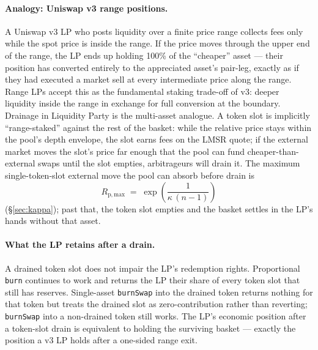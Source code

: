 \documentclass[11pt]{article}
\begin{document}
\paragraph{Analogy: Uniswap v3 range positions.}
A Uniswap v3 LP who posts liquidity over a finite price range collects
fees only while the spot price is inside the range. If the price moves
through the upper end of the range, the LP ends up holding 100\% of the
``cheaper'' asset --- their position has converted entirely to the
appreciated asset's pair-leg, exactly as if they had executed a market
sell at every intermediate price along the range. Range LPs accept this
as the fundamental staking trade-off of v3: deeper liquidity inside the
range in exchange for full conversion at the boundary. Drainage in
Liquidity Party is the multi-asset analogue. A token slot is implicitly
``range-staked'' against the rest of the basket: while the relative price
stays within the pool's depth envelope, the slot earns fees on the LMSR
quote; if the external market moves the slot's price far enough that the
pool can fund cheaper-than-external swaps until the slot empties,
arbitrageurs will drain it. The maximum single-token-slot external move
the pool can absorb before drain is
\begin{equation}
  R_{\mathrm{p,max}} \;=\; \exp\!\left(\frac{1}{\kappa\,(n - 1)}\right)
\end{equation}
(\S\ref{sec:kappa}); past that, the token slot empties and the basket
settles in the LP's hands without that asset.

\paragraph{What the LP retains after a drain.}
A drained token slot does not impair the LP's redemption rights.
Proportional \texttt{burn} continues to work and returns the LP their
share of every token slot that still has reserves. Single-asset
\texttt{burnSwap} into the drained token returns nothing for that token
but treats the drained slot as zero-contribution rather than reverting;
\texttt{burnSwap} into a non-drained token still works. The LP's economic
position after a token-slot drain is equivalent to holding the surviving
basket --- exactly the position a v3 LP holds after a one-sided range
exit.
\end{document}

